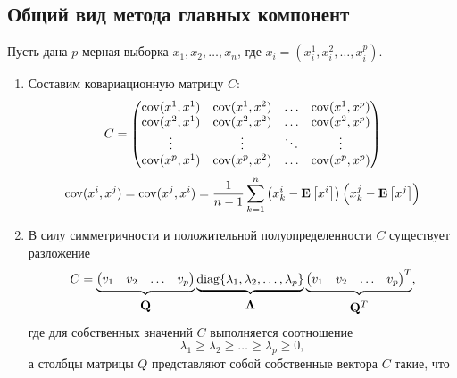 \documentclass[a4paper]{article}
\begin{document}
\subsection{Общий вид метода главных компонент}
Пусть дана $p$-мерная выборка $x_1, x_2,\hdots, x_n$, где $x_i=(x_i^1,x_i^2,\hdots,x_i^p)$.
\begin{enumerate}
    \item Составим ковариационную матрицу $C$:
    \begin{equation}
        C=\begin{pmatrix}
        \operatorname{cov}(x^1,x^1)&\operatorname{cov}(x^1,x^2)&\hdots&\operatorname{cov}(x^1,x^p)\\
        \operatorname{cov}(x^2,x^1)&\operatorname{cov}(x^2,x^2)&\hdots&\operatorname{cov}(x^2,x^p)\\
        \vdots&\vdots&\ddots&\vdots\\
        \operatorname{cov}(x^p,x^1)&\operatorname{cov}(x^p,x^2)&\hdots&\operatorname{cov}(x^p,x^p)
        \end{pmatrix}
    \end{equation}
    \begin{equation}
        \operatorname{cov}(x^i,x^j)=\operatorname{cov}(x^j,x^i)=\dfrac{1}{n-1}\sum_{k=1}^n \left(x^i_k-\mathbf{E}\left[x^i\right]\right)\left(x^j_k-\mathbf{E}\left[x^j\right]\right)
    \end{equation}
    \item В силу симметричности и положительной полуопределенности $C$ существует разложение
    \begin{equation}\label{diag_rep}
        C=\underbrace{\begin{pmatrix}v_1&v_2&\hdots&v_p\end{pmatrix}}_{\substack{\\[0.2em] \text{\normalsize $\mathbf{Q}$}}}\underbrace{\operatorname{diag}\{\lambda_1,\lambda_2,\hdots,\lambda_p\}}_{\substack{\\[0.2em] \text{\normalsize $\mathbf{\Lambda}$}}}
        \underbrace{\begin{pmatrix}v_1&v_2&\hdots&v_p\end{pmatrix}^T}_{\substack{\\[0.2em] \text{\normalsize $\mathbf{Q}^T$}}},
    \end{equation}
    где для собственных значений $C$ выполняется соотношение
    \begin{equation}
        \lambda_1\geq\lambda_2\geq\hdots\geq\lambda_p\geq0,
    \end{equation}
    а столбцы матрицы $Q$ представляют собой собственные вектора $C$ такие, что
    \begin{equation}

\end{equation}
\end{enumerate}
\end{document}
